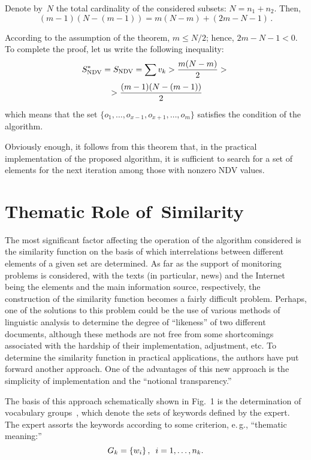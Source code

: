 \begin{multicols}{2}
     Denote by~$N$ the total cardinality of the considered subsets: $N = 
n_1+n_2$. Then,
     $$
     (m-1)(N-(m-1)) = m(N-m)+(2m-N-1)\,.
     $$
     
     According to the assumption of the theorem, $m \leq N/2$; hence, $2m-N-1 
< 0$. To complete the proof, let us write the following inequality:
     \begin{multline*}
     S^*_{\mathrm{NDV}} = S_{\mathrm{NDV}} = \sum v_k >\displaystyle\frac{\displaystyle m(N - 
m)\mathstrut}{\displaystyle 2\mathstrut} >{}\\
{}> \displaystyle\frac{\displaystyle (m-1)(N - (m-1))\mathstrut}{\displaystyle  2\mathstrut}
   \end{multline*}
     which means that the set $\{o_1, \ldots, o_{x-1}, o_{x+1}, \ldots, o_m\}$ satisfies 
the condition of the algorithm.
     
     Obviously enough, it follows from this theorem that, in the practical 
implementation of the proposed algorithm, it is sufficient to search for a set of 
elements for the next iteration among those with nonzero NDV values.
{

}
     
\section{Thematic Role of~Similarity}

     \noindent
     The most significant factor affecting the operation of the algorithm 
considered is the similarity function on the basis of which interrelations between 
different elements of a given set are determined. As far as the support of 
monitoring problems is considered, with the texts (in particular, news) and the 
Internet being the elements and the main information source, respectively, the 
construction of the similarity function becomes a fairly difficult problem. Perhaps, 
one of the solutions to this problem could be the use of various methods of 
linguistic analysis to determine the degree of ``likeness'' of two different 
documents, although these methods are not free from some shortcomings 
associated with the hardship of their implementation, adjustment, etc. To 
determine the similarity function in practical applications, the authors have put 
forward another approach. One of the advantages of this new approach is the 
simplicity of implementation and the ``notional transparency.''
     
     The basis of this approach schematically shown in Fig.~1 is the 
determination of vocabulary groups~\cite{7-d}, which denote the sets of keywords 
defined by the expert. The expert assorts the keywords according to 
some criterion, e.\,g., ``thematic meaning:''
     $$
     G_k= \left\{w_i\right\},\enskip i = 1,\ldots ,n_k.
     $$


\end{multicols}

